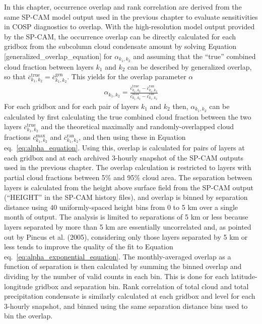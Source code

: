 In this chapter, occurrence overlap and rank correlation are derived
from the same SP-CAM model output used in the previous chapter to
evaluate sensitivities in COSP diagnostics to overlap. With the
high-resolution model output provided by the SP-CAM, the occurrence
overlap can be directly calculated for each gridbox from the subcolumn
cloud condensate amount by solving Equation
{[}generalized\_overlap\_equation{]} for \(\alpha_{k_1, k_2}\) and
assuming that the ``true'' combined cloud fraction between layers
\(k_1\) and \(k_2\) can be described by generalized overlap, so that
\(\overline{c}^\textrm{true}_{k_1, k_2} = \overline{c}^\textrm{gen}_{k_1, k_2}\).
This yields for the overlap parameter \(\alpha\) \[\begin{gathered}
    \alpha_{k_1, k_2} = \frac{
        \overline{c}^\textrm{true}_{k_1, k_2} - \overline{c}^\textrm{ran}_{k_1, k_2}
    }{
        \overline{c}^\textrm{max}_{k_1, k_2} - \overline{c}^\textrm{ran}_{k_1, k_2}
    }
    \label{alpha_equation}\end{gathered}\] For each gridbox and for each
pair of layers \(k_1\) and \(k_2\) then, \(\alpha_{k_1, k_2}\) can be
calculated by first calculating the true combined cloud fraction between
the two layers \(\overline{c}^\textrm{true}_{k_1, k_2}\) and the
theoretical maximally and randomly-overlapped cloud fractions
\(\overline{c}^\textrm{max}_{k_1, k_2}\) and
\(\overline{c}^\textrm{ran}_{k_1, k_2}\), and then using these in
Equation eq.~\ref{eq:alpha_equation}. Using this, overlap is calculated
for pairs of layers at each gridbox and at each archived 3-hourly
snapshot of the SP-CAM outputs used in the previous chapter. The overlap
calculation is restricted to layers with partial cloud fractions between
5\% and 95\% cloud area. The separation between layers is calculated
from the height above surface field from the SP-CAM output (``HEIGHT''
in the SP-CAM history files), and overlap is binned by separation
distance using 40 uniformly-spaced height bins from 0 to 5 km over a
single month of output. The analysis is limited to separations of 5 km
or less because layers separated by more than 5 km are essentially
uncorrelated and, as pointed out by Pincus et al. (2005), considering
only those layers separated by 5 km or less tends to improve the quality
of the fit to Equation eq.~\ref{eq:alpha_exponential_equation}. The
monthly-averaged overlap as a function of separation is then calculated
by summing the binned overlap and dividing by the number of valid counts
in each bin. This is done for each latitude-longitude gridbox and
separation bin. Rank correlation of total cloud and total precipitation
condensate is similarly calculated at each gridbox and level for each
3-hourly snapshot, and binned using the same separation distance bins
used to bin the overlap.

